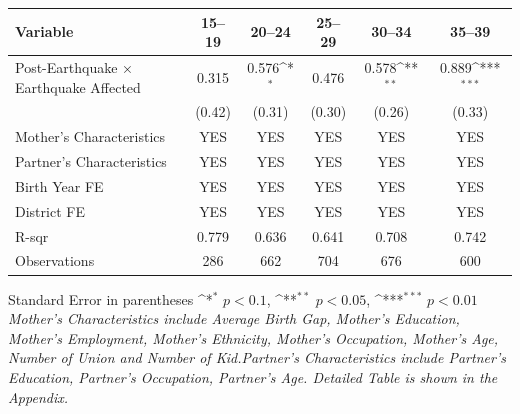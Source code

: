 \def\sym#1{\ifmmode^{#1}\else\(^{#1}\)\fi}
\renewcommand{\arraystretch}{1.4}
\small
\setlength{\tabcolsep}{6pt}

\begin{flushleft}
\begin{tabular}{@{}p{8.5cm}*{5}{c}@{}}
\hline\hline
Variable & 15--19 & 20--24 & 25--29 & 30--34 & 35--39 \\
\hline
Post-Earthquake × Earthquake Affected & 0.315 & 0.576\sym{*} & 0.476 & 0.578\sym{**} & 0.889\sym{***} \\
                                      & (0.42) & (0.31) & (0.30) & (0.26) & (0.33) \\
\hline
Mother's Characteristics              & YES & YES & YES & YES & YES \\
Partner's Characteristics             & YES & YES & YES & YES & YES \\
\hline
Birth Year FE                         & YES & YES & YES & YES & YES \\
District FE                           & YES & YES & YES & YES & YES \\
R-sqr                                 & 0.779 & 0.636 & 0.641 & 0.708 & 0.742 \\
Observations                          & 286 & 662 & 704 & 676 & 600 \\
\hline\hline
\end{tabular}

\vspace{4pt}
\noindent\footnotesize
Standard Error in parentheses \sym{*} \(p<0.1\), \sym{**} \(p<0.05\), \sym{***} \(p<0.01\)\\
\textit{Mother’s Characteristics include Average Birth Gap, Mother’s Education, Mother’s Employment, Mother’s Ethnicity, Mother’s Occupation, Mother’s Age, Number of Union and Number of Kid.Partner’s Characteristics include Partner’s Education, Partner’s Occupation, Partner’s Age. Detailed Table is shown in the Appendix.}
\end{flushleft}
